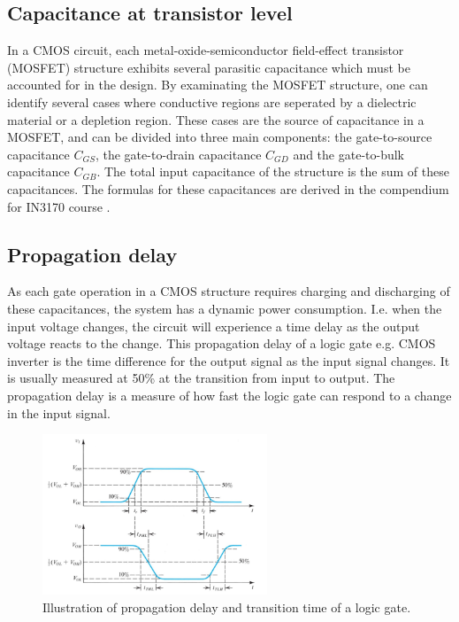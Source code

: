 \documentclass[onecolumn]{article}
\begin{document}
\subsection{Capacitance at transistor level}
In a CMOS circuit, each metal-oxide-semiconductor field-effect transistor (MOSFET) structure exhibits several parasitic capacitance which must be accounted for in the design. By examinating the MOSFET structure, one can identify several cases where conductive regions are seperated by a dielectric material or a depletion region. These cases are the source of capacitance in a MOSFET, and can be divided into three main components: the gate-to-source capacitance $C_{GS}$, the gate-to-drain capacitance $C_{GD}$ and the gate-to-bulk capacitance $C_{GB}$. The total input capacitance of the structure is the sum of these capacitances. The formulas for these capacitances are derived in the compendium for IN3170 course \cite{Kompendium}.

\subsection{Propagation delay}
As each gate operation in a CMOS structure requires charging and discharging of these capacitances, the system has a dynamic power consumption. I.e. when the input voltage changes, the circuit will experience a time delay as the output voltage reacts to the change. This propagation delay of a logic gate e.g. CMOS inverter is the time difference for the output signal as the input signal changes. It is usually measured at 50\% at the transition from input to output. The propagation delay is a measure of how fast the logic gate can respond to a change in the input signal.

\begin{figure}[h!]
    \centering
    \includegraphics[width=0.6\textwidth]{tphl.png}
    \caption{Illustration of propagation delay and transition time of a logic gate. \cite{Sedra/Smith}}
    \label{fig:tphl}
\end{figure}
\end{document}
